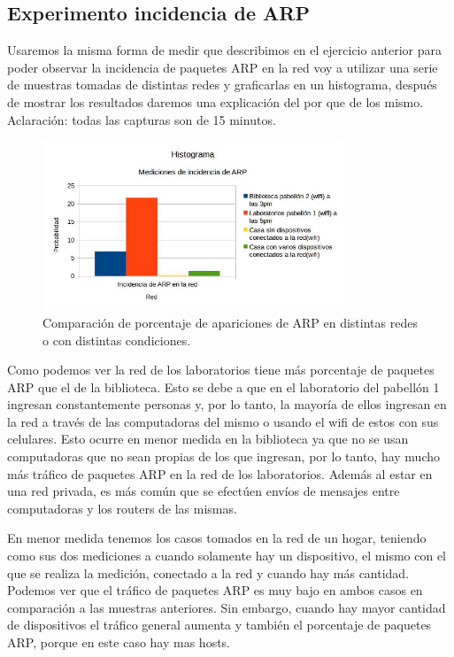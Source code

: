 \subsection{Experimento incidencia de ARP}

Usaremos la misma forma de medir que describimos en el ejercicio anterior para poder observar la incidencia de paquetes ARP en la red voy a utilizar una serie de muestras 
tomadas de distintas redes y graficarlas en un histograma, después de mostrar los resultados daremos una explicación del por que de los mismo. Aclaración: todas las capturas
son de 15 minutos.

\begin{figure}[ht!]
\centering
\includegraphics[width=90mm]{imagenes/IncidenciaARP.jpg}
\caption{Comparación de porcentaje de apariciones de ARP en distintas redes o con distintas condiciones.\label{overflow}}
\end{figure}

Como podemos ver la red de los laboratorios tiene más porcentaje de paquetes ARP que el de la biblioteca. Esto se debe a que en el laboratorio del pabellón 1 ingresan 
constantemente personas y, por lo tanto, la mayoría de ellos ingresan en la red a través de las computadoras del mismo o usando el wifi de estos con sus celulares. Esto 
ocurre en menor medida en la biblioteca ya que no se usan computadoras que no sean propias de los que ingresan, por lo tanto, hay mucho más tráfico de paquetes ARP en la red 
de los laboratorios. Además al estar en una red privada, es más común que se efectúen envíos de mensajes entre computadoras y los routers de las mismas.

En menor medida tenemos los casos tomados en la red de un hogar, teniendo como sus dos mediciones a cuando solamente hay un dispositivo, el mismo con el que se realiza la medición, 
conectado a la red y cuando hay más cantidad. Podemos ver que el tráfico de paquetes ARP es muy bajo en ambos casos en comparación a las muestras anteriores. Sin embargo, 
cuando hay mayor cantidad de dispositivos el tráfico general aumenta y también el porcentaje de paquetes ARP, porque en este caso hay mas hosts.


